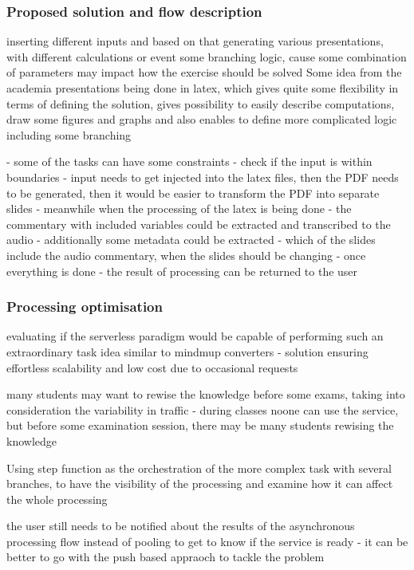 \subsubsection{Proposed solution and flow description}

inserting different inputs and based on that generating various presentations, with different calculations or event some branching logic, cause some combination of parameters may impact how the exercise should be solved
Some idea from the academia presentations being done in latex, which gives quite some flexibility in terms of defining the solution, gives possibility to easily describe computations, draw some figures and graphs and also enables to define more complicated logic including some branching 

- some of the tasks can have some constraints - check if the input is within boundaries
- input needs to get injected into the latex files, then the PDF needs to be generated, then it would be easier to transform the PDF into separate slides
- meanwhile when the processing of the latex is being done - the commentary with included variables could be extracted and transcribed to the audio
- additionally some metadata could be extracted - which of the slides include the audio commentary, when the slides should be changing
- once everything is done - the result of processing can be returned to the user

\subsubsection{Processing optimisation}

evaluating if the serverless paradigm would be capable of performing such an extraordinary task
idea similar to mindmup converters - solution ensuring effortless scalability and low cost due to occasional requests

many students may want to rewise the knowledge before some exams, taking into consideration the variability in traffic - during classes noone can use the service, but before some examination session, there may be many students rewising the knowledge

Using step function as the orchestration of the more complex task with several branches, to have the visibility of the processing and examine how it can affect the whole processing

the user still needs to be notified about the results of the asynchronous processing flow
instead of pooling to get to know if the service is ready - it can be better to go with the push based appraoch to tackle the problem

